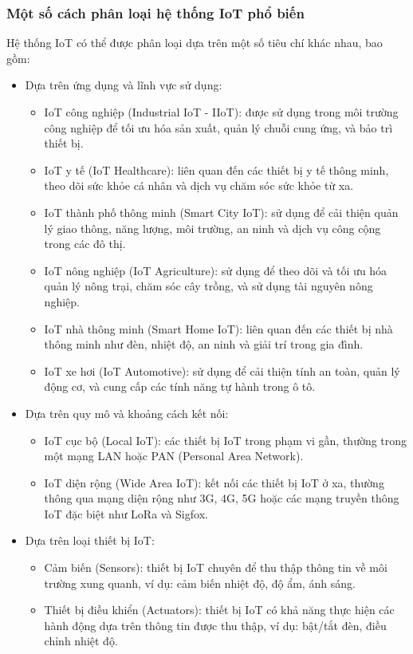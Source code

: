 \documentclass{article} %
\begin{document}
\subsubsection{Một số cách phân loại hệ thống IoT phổ biến}

Hệ thống IoT có thể được phân loại dựa trên một số tiêu chí khác nhau, bao gồm:
\begin{itemize}
    \item Dựa trên ứng dụng và lĩnh vực sử dụng:
    \begin{itemize}
\item IoT công nghiệp (Industrial IoT - IIoT): được sử dụng trong môi trường công nghiệp để tối ưu hóa sản xuất, quản lý chuỗi cung ứng, và bảo trì thiết bị.
\item IoT y tế (IoT Healthcare): liên quan đến các thiết bị y tế thông minh, theo dõi sức khỏe cá nhân và dịch vụ chăm sóc sức khỏe từ xa.
\item IoT thành phố thông minh (Smart City IoT): sử dụng để cải thiện quản lý giao thông, năng lượng, môi trường, an ninh và dịch vụ công cộng trong các đô thị.
\item IoT nông nghiệp (IoT Agriculture): sử dụng để theo dõi và tối ưu hóa quản lý nông trại, chăm sóc cây trồng, và sử dụng tài nguyên nông nghiệp.
\item IoT nhà thông minh (Smart Home IoT): liên quan đến các thiết bị nhà thông minh như đèn, nhiệt độ, an ninh và giải trí trong gia đình.
\item IoT xe hơi (IoT Automotive): sử dụng để cải thiện tính an toàn, quản lý động cơ, và cung cấp các tính năng tự hành trong ô tô.

    \end{itemize}
    \item  Dựa trên quy mô và khoảng cách kết nối:
\begin{itemize}
\item IoT cục bộ (Local IoT): các thiết bị IoT trong phạm vi gần, thường trong một mạng LAN hoặc PAN (Personal Area Network).
\item IoT diện rộng (Wide Area IoT): kết nối các thiết bị IoT ở xa, thường thông qua mạng diện rộng như 3G, 4G, 5G hoặc các mạng truyền thông IoT đặc biệt như LoRa và Sigfox.
\end{itemize}


\item Dựa trên loại thiết bị IoT:
\begin{itemize}
\item Cảm biến (Sensors): thiết bị IoT chuyên để thu thập thông tin về môi trường xung quanh, ví dụ: cảm biến nhiệt độ, độ ẩm, ánh sáng.
\item Thiết bị điều khiển (Actuators): thiết bị IoT có khả năng thực hiện các hành động dựa trên thông tin được thu thập, ví dụ: bật/tắt đèn, điều chỉnh nhiệt độ.
\end{itemize}


\end{itemize}
\end{document}

